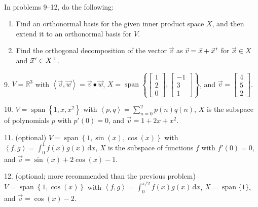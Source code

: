 \documentclass{article}
\begin{document}
~\\

In problems 9--12, do the following:

\begin{enumerate}

	\item Find an orthonormal basis for the given inner product space $X$, and then extend it to an orthonormal basis for $V$.

	\item Find the orthogonal decomposition of the vector $\vec{v}$ as $\vec{v} = \vec{x} + \vec{x}\hspace{0.1em}'$ for $\vec{x} \in X$ and $\vec{x}\hspace{0.1em}' \in X^\perp$.

\end{enumerate}

9. $V = \mathbb{R}^3$ with $\left< \vec{v}, \vec{w} \right> = \vec{v} \bullet \vec{w}$, $X = \operatorname{span}\left\{ \left[\begin{array}{c} 1 \\ 2 \\ 0 \end{array}\right], \left[\begin{array}{c} -1 \\ 3 \\ 1 \end{array}\right] \right\}$, and $\vec{v} = \left[\begin{array}{c} 4 \\ 5 \\ 2 \end{array}\right]$.

10. $V = \operatorname{span}\left\{ 1, x, x^2 \right\}$ with $\left< p, q \right> = \sum_{n = 0}^2 p(n)q(n)$, $X$ is the subspace of polynomials $p$ with $p'(0) = 0$, and $\vec{v} = 1 + 2x + x^2$.

11. (optional) $V = \operatorname{span}\left\{ 1, \sin(x), \cos(x) \right\}$ with $\left< f, g \right> = \int_0^1 f(x)g(x)\,\mathrm{d} x$, $X$ is the subspace of functions $f$ with $f'(0) = 0$, and $\vec{v} = \sin(x) + 2\cos(x) - 1$.

12. (optional; more recommended than the previous problem) $V = \operatorname{span}\left\{ 1, \cos(x) \right\}$ with $\left< f, g \right> = \int_0^{\pi/2} f(x)g(x)\,\mathrm{d} x$, $X = \operatorname{span}\{1\}$, and $\vec{v} = \cos(x) - 2$.
\end{document}
